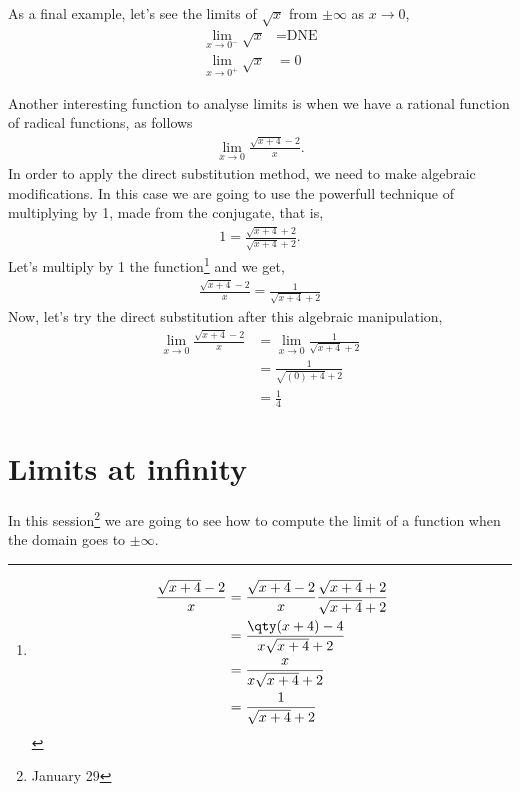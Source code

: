 \documentclass[../main-notes.tex]{subfile}
\begin{document}
As a final example, let's see the limits of \(\sqrt{x}\) from $\pm\infty$ as $x\to0$,
\begin{align*}
    \lim_{x\to 0^{-}}\sqrt{x} &= \text{DNE} \\
    \lim_{x\to 0^{+}}\sqrt{x} &= 0
\end{align*}

Another interesting function to analyse limits is when we have a rational function of radical functions, as follows
\begin{gather*}
    \lim_{x\to0}\frac{\sqrt{x+4}-2}{x}.
\end{gather*}
In order to apply the direct substitution method, we need to make algebraic modifications.
In this case we are going to use the powerfull technique of multiplying by \num{1}, made from the conjugate, that is,
\begin{gather*}
    1 = \frac{\sqrt{x+4}+2}{\sqrt{x+4}+2}.
\end{gather*}
Let's multiply by \num{1} the function\footnote{
    \begin{align*}
    \frac{\sqrt{x+4}-2}{x} &= \frac{\sqrt{x+4}-2}{x}\frac{\sqrt{x+4}+2}{\sqrt{x+4}+2} \\
                           &= \frac{\qty(x+4)-4}{x\sqrt{x+4}+2} \\
                           &= \frac{x}{x\sqrt{x+4}+2} \\
                           &=\frac{1}{\sqrt{x+4}+2}
    \end{align*}
} and we get,
\begin{align*}
    \frac{\sqrt{x+4}-2}{x} =\frac{1}{\sqrt{x+4}+2}
\end{align*}
Now, let's try the direct substitution after this algebraic manipulation,
\begin{align*}
    \lim_{x\to0}\frac{\sqrt{x+4}-2}{x} &= \lim_{x\to0}\frac{1}{\sqrt{x+4}+2} \\
                                       &= \frac{1}{\sqrt{(0)+4}+2} \\
                                       &= \frac{1}{4}
\end{align*}

\newpage

\section{Limits at infinity}

In this session\footnote{January 29} we are going to see how to compute the limit of a function when the domain goes to $\pm\infty$.
\end{document}
